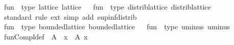 \begin{isabellebody}
%
\endisadelimproof
\isanewline
\isanewline
{}\isamarkupfalse%
\isanewline
\isanewline
{}\isamarkupfalse%
\ {\isachardoublequoteopen}fun{\isachardoublequoteclose}\ {\isacharcolon}{\kern0pt}{\isacharcolon}{\kern0pt}\ {\isacharparenleft}{\kern0pt}type{\isacharcomma}{\kern0pt}\ lattice{\isacharparenright}{\kern0pt}\ lattice%
\isadelimproof
\ %
\endisadelimproof
%
\isatagproof
\isacommand{{\isachardot}{\kern0pt}{\isachardot}{\kern0pt}}\isamarkupfalse%
%
\endisatagproof
{\isafoldproof}%
%
\isadelimproof
%
\endisadelimproof
\isanewline
\isanewline
{}\isamarkupfalse%
\ {\isachardoublequoteopen}fun{\isachardoublequoteclose}\ {\isacharcolon}{\kern0pt}{\isacharcolon}{\kern0pt}\ {\isacharparenleft}{\kern0pt}type{\isacharcomma}{\kern0pt}\ distrib{\isacharunderscore}{\kern0pt}lattice{\isacharparenright}{\kern0pt}\ distrib{\isacharunderscore}{\kern0pt}lattice\isanewline
%
\isadelimproof
\ \ %
\endisadelimproof
%
\isatagproof
{}\isamarkupfalse%
\ standard\ {\isacharparenleft}{\kern0pt}rule\ ext{\isacharcomma}{\kern0pt}\ simp\ add{\isacharcolon}{\kern0pt}\ sup{\isacharunderscore}{\kern0pt}inf{\isacharunderscore}{\kern0pt}distrib{}{\isacharparenright}{\kern0pt}%
\endisatagproof
{\isafoldproof}%
%
\isadelimproof
\isanewline
%
\endisadelimproof
\isanewline
{}\isamarkupfalse%
\ {\isachardoublequoteopen}fun{\isachardoublequoteclose}\ {\isacharcolon}{\kern0pt}{\isacharcolon}{\kern0pt}\ {\isacharparenleft}{\kern0pt}type{\isacharcomma}{\kern0pt}\ bounded{\isacharunderscore}{\kern0pt}lattice{\isacharparenright}{\kern0pt}\ bounded{\isacharunderscore}{\kern0pt}lattice%
\isadelimproof
\ %
\endisadelimproof
%
\isatagproof
\isacommand{{\isachardot}{\kern0pt}{\isachardot}{\kern0pt}}\isamarkupfalse%
%
\endisatagproof
{\isafoldproof}%
%
\isadelimproof
%
\endisadelimproof
\isanewline
\isanewline
{}\isamarkupfalse%
\ {\isachardoublequoteopen}fun{\isachardoublequoteclose}\ {\isacharcolon}{\kern0pt}{\isacharcolon}{\kern0pt}\ {\isacharparenleft}{\kern0pt}type{\isacharcomma}{\kern0pt}\ uminus{\isacharparenright}{\kern0pt}\ uminus\isanewline
{}\isanewline
\isanewline
{}\isamarkupfalse%
\ fun{\isacharunderscore}{\kern0pt}Compl{\isacharunderscore}{\kern0pt}def{\isacharcolon}{\kern0pt}\ {\isachardoublequoteopen}{\isacharminus}{\kern0pt}\ A\ {\isacharequal}{\kern0pt}\ {\isacharparenleft}{\kern0pt}{\isasymlambda}x{\isachardot}{\kern0pt}\ {\isacharminus}{\kern0pt}\ A\ x{\isacharparenright}{\kern0pt}{\isachardoublequoteclose}\isanewline
\isanewline

\end{isabellebody}
